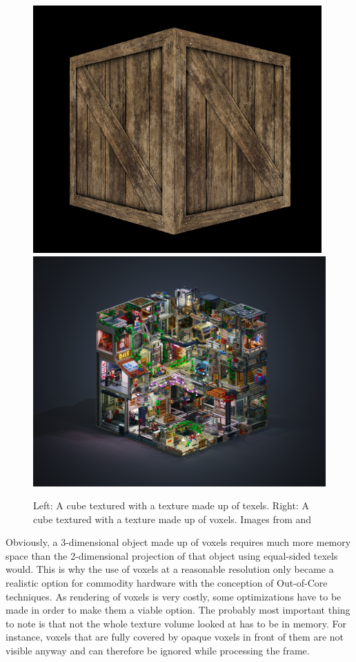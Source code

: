 \begin{figure}[h]
  \begin{center}
    \includegraphics[width=.4\textwidth]{logos/texel_textured_cube.png}
    \hfill
    \includegraphics[width=.44\textwidth]{logos/voxel_textured_cube.png}
    \caption{Left: A cube textured with a texture made up of texels. Right: A cube textured with a texture made up of voxels. Images from \cite{Bej:OpenGLEx} and \cite{Ing:VoxPeop}}
  \end{center}
\end{figure}

Obviously, a 3-dimensional object made up of voxels requires much more memory space than the 2-dimensional projection of that object using equal-sided texels would. This is why the use of voxels at a reasonable resolution only became a realistic option for commodity hardware with the conception of Out-of-Core techniques. As rendering of voxels is very costly, some optimizations have to be made in order to make them a viable option. The probably most important thing to note is that not the whole texture volume looked at has to be in memory. For instance, voxels that are fully covered by opaque voxels in front of them are not visible anyway and can therefore be ignored while processing the frame.

